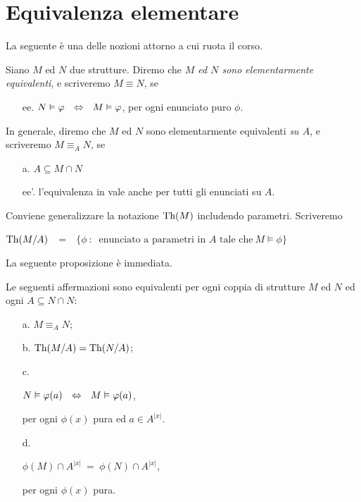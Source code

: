 \section{Equivalenza elementare}\label{eqel}
La seguente \`e una delle nozioni attorno a cui ruota il corso.

\begin{definition}
Siano $M$ ed $N$ due strutture. Diremo che \emph{$M$ ed $N$ sono elementarmente equivalenti}, e scriveremo \emph{$M\equiv N$}, se
\begin{itemize}
\item[ee.] $N\vDash\varphi\ \ \Leftrightarrow\ \ M\vDash \varphi$,\hspace{4ex} per ogni enunciato puro $\phi$.
\end{itemize}
In generale, diremo che $M$ ed $N$ sono elementarmente equivalenti \emph{su $A$}, e scriveremo \emph{$M\equiv_A N$}, se 
\begin{itemize}
\item[a.] $A\subseteq M\cap N$
\item[ee'.] l'equivalenza in  vale anche per tutti gli enunciati su $A$.\QED
\end{itemize} 
\end{definition}

Conviene generalizzare la notazione $\textrm{Th}(M)$ includendo parametri. Scriveremo 

\hfil \emph{$\textrm{Th}(M/A)$}\ \ =\ \ $\Big\{\phi\ :\ \textrm{ enunciato a parametri in }A\textrm{ tale che}\  M\models\phi\Big\}$

La seguente proposizione \`e immediata.

\begin{proposition}\label{equivalentielementareequivaleza}
Le seguenti affermazioni sono equivalenti per ogni coppia di strutture $M$ ed $N$ ed ogni $A\subseteq N\cap N$:
\begin{itemize}
\item[a.] $M\equiv_A N$;
\item[b.] $\textrm{Th}(M/A)=\textrm{Th}(N/A)$;
\item[c.] \parbox{25ex}{$N\vDash\varphi(a)\ \ \Leftrightarrow\ \ M\vDash \varphi(a)$,}  per ogni $\phi(x)$ pura ed $a\in A^{|x|}$.
\item[d.]  \parbox{25ex}{$\phi(M) \cap A^{|x|}\ =\ \phi(N) \cap A^{|x|}$,} per ogni $\phi(x)$ pura.\QED
\end{itemize}
\end{proposition}

